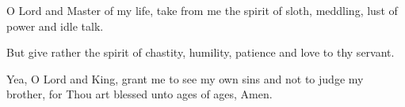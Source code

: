 \begin{priest}
\item O Lord and Master of my life,
    take from me the spirit of sloth, meddling, lust of power and idle talk.
\item But give rather the spirit of chastity, humility,
    patience and love to thy servant.
\item Yea, O Lord and King, grant me to see my own sins and not to judge my brother,
    for Thou art blessed unto ages of ages, Amen.
\end{priest}